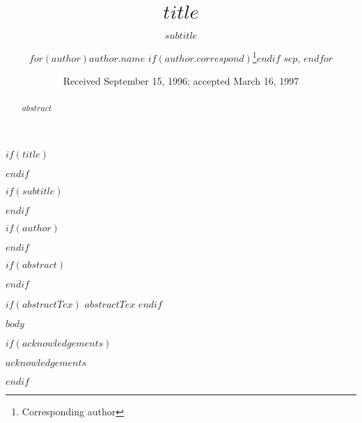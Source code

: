 \documentclass{aa}
\begin{document}
$if(title)$
  \title{$title$}
$endif$

$if(subtitle)$
  \subtitle{$subtitle$}
$endif$

$if(author)$

  \author{$for(author)$$author.name$
         $if(author.correspond)$\fnmsep\thanks{Corresponding author}$endif$
         $sep$, $endfor$}

$endif$

   \date{Received September 15, 1996; accepted March 16, 1997}


$if(abstract)$
\begin{abstract}
  $abstract$
\end{abstract}
$endif$

$if(abstractTex)$
 $abstractTex$
$endif$


   \maketitle
%

$body$

$if(acknowledgements)$
\begin{acknowledgements}
$acknowledgements$
\end{acknowledgements}
$endif$
\end{document}
